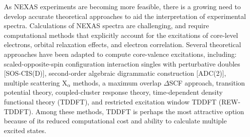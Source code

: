 \documentclass[8.5pt,twoside,twocolumn]{article}
\begin{document}
As NEXAS experiments are becoming more feasible, there is a growing need to develop accurate theoretical approaches to aid the interpretation of experimental spectra.
Calculations of NEXAS spectra are challenging, and require computational methods that explicitly account for the excitations of core-level electrons, orbital relaxation effects, and electron correlation. \cite{coriani_coupled-cluster_2012} Several theoretical approaches have been adapted to compute core-valence excitations, including: scaled-opposite-spin configuration interaction singles with perturbative doubles [SOS-CIS(D)],\cite{asmuruf_calculation_2008} second-order algebraic digrammatic construction [ADC(2)],\cite{schirmer_beyond_1982,trofimov_efficient_1995} multiple scattering X$_\alpha$ methods, \cite{sheehy_correlation_1989} a maximum overlap $\Delta$SCF approach, \cite{besley_self-consistent-field_2009} transition potential theory,\cite{triguero_calculations_1998} coupled-cluster response theory, \cite{coriani_coupled-cluster_2012} time-dependent density functional theory (TDDFT),\cite{stener_time_2003} and restricted excitation window TDDFT (REW-TDDFT). \cite{lopata_linear-response_2012} Among these methods, TDDFT is perhaps the most attractive option because of its reduced computational cost and ability to calculate multiple excited states.
\end{document}
